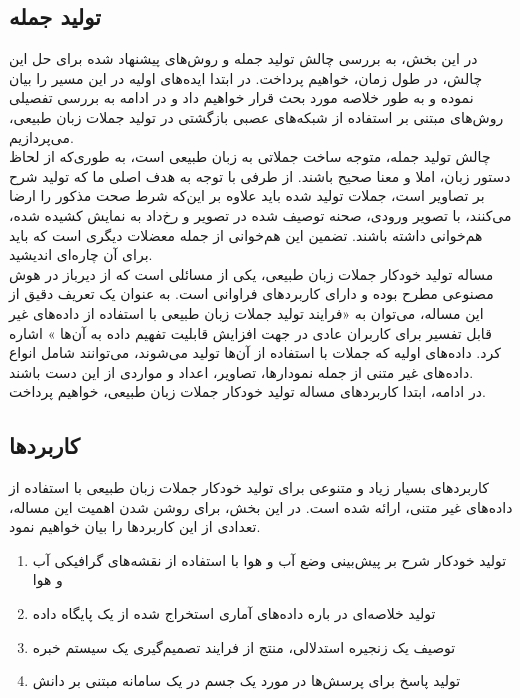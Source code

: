 \subsection{تولید جمله}
در این بخش، به بررسی چالش تولید جمله و روش‌های پیشنهاد شده برای حل این چالش، در طول زمان، خواهیم پرداخت. در ابتدا ایده‌های اولیه در این مسیر را بیان نموده و به طور خلاصه مورد بحث قرار خواهیم داد و در ادامه به بررسی تفصیلی روش‌های مبتنی بر استفاده از شبکه‌های عصبی بازگشتی در تولید جملات زبان طبیعی، می‌پردازیم.
\\
 چالش تولید جمله، متوجه ساخت جملاتی به زبان طبیعی است، به طوری‌که از لحاظ دستور زبان، املا و معنا صحیح باشند. از طرفی با توجه به هدف اصلی ما که تولید شرح بر تصاویر است، جملات تولید شده باید علاوه بر این‌که شرط صحت مذکور را ارضا می‌کنند، با تصویر ورودی، صحنه توصیف شده در تصویر و رخ‌داد به نمایش کشیده شده، هم‌خوانی داشته باشند. تضمین این هم‌خوانی از جمله معضلات دیگری است که باید برای آن چاره‌ای اندیشید.
\\
مساله تولید خودکار جملات زبان طبیعی، یکی از مسائلی است که از دیرباز در هوش مصنوعی مطرح بوده و دارای کاربردهای فراوانی است. به عنوان یک تعریف دقیق از این مساله، می‌توان به «فرایند تولید جملات زبان طبیعی با استفاده از داده‌های غیر قابل تفسیر برای کاربران عادی در جهت افزایش قابلیت تفهیم داده‌ به آن‌ها \cite{reiter1997building}» اشاره کرد. داده‌های اولیه که جملات با استفاده از آن‌ها تولید می‌شوند، می‌توانند شامل انواع داده‌های غیر متنی از جمله نمودارها، تصاویر، اعداد و مواردی از این دست باشند.
\\
در ادامه، ابتدا کاربردهای مساله تولید خودکار جملات زبان طبیعی، خواهیم پرداخت.


\subsection[کاربردها\cite{reiter1997building}]{کاربردها}
کاربردهای بسیار زیاد و متنوعی برای تولید خودکار جملات زبان طبیعی با استفاده از داده‌های غیر متنی، ارائه شده است. در این بخش، برای روشن شدن اهمیت این مساله، تعدادی از این کاربردها را بیان خواهیم نمود.
\\
\begin{enumerate}
\item
تولید خودکار شرح بر پیش‌بینی وضع آب و هوا با استفاده از نقشه‌های گرافیکی آب و هوا
\item 
تولید خلاصه‌ای در باره داده‌های آماری استخراج شده از یک پایگاه داده 
\item
توصیف یک زنجیره استدلالی، منتج از فرایند تصمیم‌گیری یک سیستم خبره
\item
تولید پاسخ برای پرسش‌ها در مورد یک جسم در یک سامانه مبتنی بر دانش
\end{enumerate}


